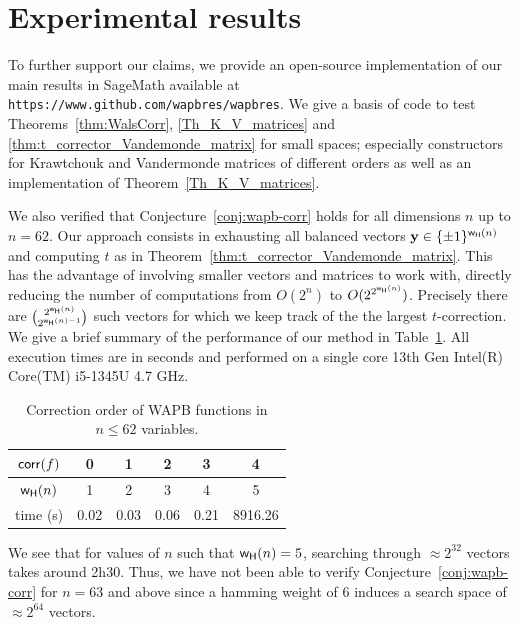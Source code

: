 \section{Experimental results}\label{sec:exp}
To further support our claims, we provide an open-source implementation of our
main results in SageMath \cite{sagemath} available at \texttt{https://www.github.com/wapbres/wapbres}.
We give a basis of code to test Theorems~\ref{thm:WalsCorr}, \ref{Th_K_V_matrices}
and \ref{thm:t_corrector_Vandemonde_matrix} for small spaces; especially
constructors for Krawtchouk and Vandermonde matrices of different orders as well
as an implementation of Theorem~\ref{Th_K_V_matrices}.

We also verified that Conjecture~\ref{conj:wapb-corr} holds for all dimensions
$n$ up to $n = 62$. Our approach consists in exhausting all balanced vectors
$\mathbf{y} \in \{\pm1\}^{\mathsf{w_H}(n)}$ and computing $t$ as in Theorem~\ref{thm:t_corrector_Vandemonde_matrix}.
This has the advantage of involving smaller vectors and matrices to work with,
directly reducing the number of computations from $O(2^n)$ to $O(2^{2^{\mathsf{w_H}(n)}})$.
Precisely there are $\binom{2^{\mathsf{w_H}(n)}}{2^{\mathsf{w_H}(n) - 1}}$ such vectors for which we
keep track of the the largest $t$-correction. We give a brief summary of the
performance of our method in Table~\ref{tab:execution_times}. All execution
times are in seconds and performed on a single core 13th Gen Intel(R) Core(TM)
i5-1345U 4.7 GHz.

\begin{table}[ht]
    \centering
    \caption{Correction order of WAPB functions in $n \leq 62$ variables.}
    \label{tab:execution_times}
    \begin{tabular}{|c|c|c|c|c|c|}
        \hline
        $\mathsf{corr}(f)$ & 0 & 1 & 2 & 3 & 4\\
        \hline
        $\mathsf{w_H}(n)$ & 1 & 2 & 3 & 4 & 5\\
        \hline
        time (s) & 0.02 & 0.03 & 0.06 & 0.21 & 8916.26\\
        \hline
    \end{tabular}
\end{table}

We see that for values of $n$ such that $\mathsf{w_H}(n) = 5$, searching through $\approx2^{32}$
vectors takes around 2h30. Thus, we have not been able to verify Conjecture~\ref{conj:wapb-corr}
for $n = 63$ and above since a hamming weight of 6 induces a search space of
$\approx 2^{64}$ vectors.
